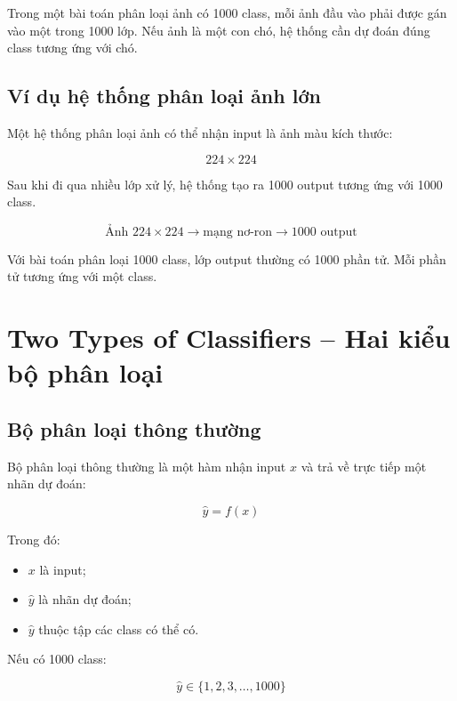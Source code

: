 \begin{vidu}
Trong một bài toán phân loại ảnh có 1000 class, mỗi ảnh đầu vào phải được gán vào một trong 1000 lớp. Nếu ảnh là một con chó, hệ thống cần dự đoán đúng class tương ứng với chó.
\end{vidu}

\subsection{Ví dụ hệ thống phân loại ảnh lớn}

Một hệ thống phân loại ảnh có thể nhận input là ảnh màu kích thước:

\[
    224 \times 224
\]

Sau khi đi qua nhiều lớp xử lý, hệ thống tạo ra 1000 output tương ứng với 1000 class.

\[
    \text{Ảnh } 224 \times 224
    \longrightarrow
    \text{mạng nơ-ron}
    \longrightarrow
    1000 \text{ output}
\]

\begin{ghinho}
Với bài toán phân loại 1000 class, lớp output thường có 1000 phần tử. Mỗi phần tử tương ứng với một class.
\end{ghinho}

\section{Two Types of Classifiers -- Hai kiểu bộ phân loại}

\subsection{Bộ phân loại thông thường}

Bộ phân loại thông thường là một hàm nhận input $x$ và trả về trực tiếp một nhãn dự đoán:

\[
    \hat{y}=f(x)
\]

Trong đó:

\begin{itemize}
    \item $x$ là input;
    \item $\hat{y}$ là nhãn dự đoán;
    \item $\hat{y}$ thuộc tập các class có thể có.
\end{itemize}

Nếu có 1000 class:

\[
    \hat{y} \in \{1,2,3,\ldots,1000\}
\]

